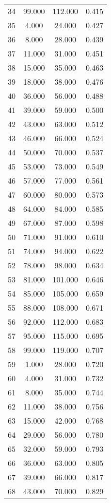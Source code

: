 \begin{tabular}{cccc}
  34 & 99.000 & 112.000 & 0.415 \\ 
  35 & 4.000 & 24.000 & 0.427 \\ 
  36 & 8.000 & 28.000 & 0.439 \\ 
  37 & 11.000 & 31.000 & 0.451 \\ 
  38 & 15.000 & 35.000 & 0.463 \\ 
  39 & 18.000 & 38.000 & 0.476 \\ 
  40 & 36.000 & 56.000 & 0.488 \\ 
  41 & 39.000 & 59.000 & 0.500 \\ 
  42 & 43.000 & 63.000 & 0.512 \\ 
  43 & 46.000 & 66.000 & 0.524 \\ 
  44 & 50.000 & 70.000 & 0.537 \\ 
  45 & 53.000 & 73.000 & 0.549 \\ 
  46 & 57.000 & 77.000 & 0.561 \\ 
  47 & 60.000 & 80.000 & 0.573 \\ 
  48 & 64.000 & 84.000 & 0.585 \\ 
  49 & 67.000 & 87.000 & 0.598 \\ 
  50 & 71.000 & 91.000 & 0.610 \\ 
  51 & 74.000 & 94.000 & 0.622 \\ 
  52 & 78.000 & 98.000 & 0.634 \\ 
  53 & 81.000 & 101.000 & 0.646 \\ 
  54 & 85.000 & 105.000 & 0.659 \\ 
  55 & 88.000 & 108.000 & 0.671 \\ 
  56 & 92.000 & 112.000 & 0.683 \\ 
  57 & 95.000 & 115.000 & 0.695 \\ 
  58 & 99.000 & 119.000 & 0.707 \\ 
  59 & 1.000 & 28.000 & 0.720 \\ 
  60 & 4.000 & 31.000 & 0.732 \\ 
  61 & 8.000 & 35.000 & 0.744 \\ 
  62 & 11.000 & 38.000 & 0.756 \\ 
  63 & 15.000 & 42.000 & 0.768 \\ 
  64 & 29.000 & 56.000 & 0.780 \\ 
  65 & 32.000 & 59.000 & 0.793 \\ 
  66 & 36.000 & 63.000 & 0.805 \\ 
  67 & 39.000 & 66.000 & 0.817 \\ 
  68 & 43.000 & 70.000 & 0.829 \\ 

\end{tabular}
